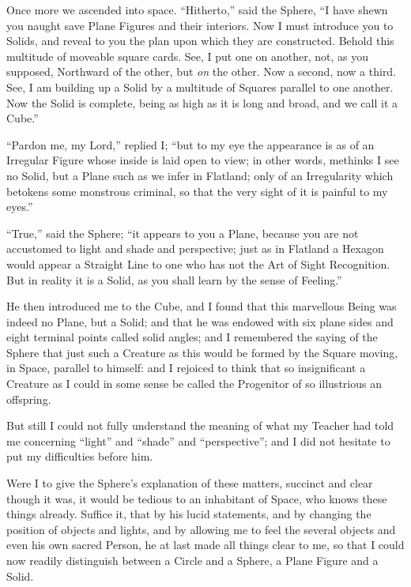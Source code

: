 \documentclass[10pt, kindle, oneside]{kindle}
\begin{document}
Once more we ascended into space. ``Hitherto,'' said the Sphere, ``I have shewn
you naught save Plane Figures and their interiors. Now I must introduce you to
Solids, and reveal to you the plan upon which they are constructed. Behold
this multitude of moveable square cards. See, I put one on another, not, as
you supposed, Northward of the other, but \emph{on} the other. Now a second, now a
third. See, I am building up a Solid by a multitude of Squares parallel to one
another. Now the Solid is complete, being as high as it is long and broad, and
we call it a Cube.''

``Pardon me, my Lord,'' replied I; ``but to my eye the appearance is as of an
Irregular Figure whose inside is laid open to view; in other words, methinks I
see no Solid, but a Plane such as we infer in Flatland; only of an
Irregularity which betokens some monstrous criminal, so that the very sight of
it is painful to my eyes.''

``True,'' said the Sphere; ``it appears to you a Plane, because you are not
accustomed to light and shade and perspective; just as in Flatland a Hexagon
would appear a Straight Line to one who has not the Art of Sight Recognition.
But in reality it is a Solid, as you shall learn by the sense of Feeling.''

He then introduced me to the Cube, and I found that this marvellous Being was
indeed no Plane, but a Solid; and that he was endowed with six plane sides and
eight terminal points called solid angles; and I remembered the saying of the
Sphere that just such a Creature as this would be formed by the Square moving,
in Space, parallel to himself: and I rejoiced to think that so insignificant a
Creature as I could in some sense be called the Progenitor of so illustrious
an offspring.

But still I could not fully understand the meaning of what my Teacher had told
me concerning ``light'' and ``shade'' and ``perspective''; and I did not hesitate to
put my difficulties before him.

Were I to give the Sphere's explanation of these matters, succinct and clear
though it was, it would be tedious to an inhabitant of Space, who knows these
things already. Suffice it, that by his lucid statements, and by changing the
position of objects and lights, and by allowing me to feel the several objects
and even his own sacred Person, he at last made all things clear to me, so
that I could now readily distinguish between a Circle and a Sphere, a Plane
Figure and a Solid.
\end{document}
